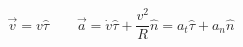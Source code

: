 \begin{equation}
\boxed{\vec v = v\hat\tau}\quad\quad \boxed{\vec a = \dot v \hat\tau + \frac{v^2}{R}\hat n = a_t\hat\tau + a_n\hat n}
\end{equation}
                                                                                                                                                                                                                                                                                                                                                                                                                                                                                                                                                                                                                                                                                                                                                                                                                                                                                                                                                                                                                                                                                                                                                                                                                                                                                                                                                                                                                                                                                                                                                                                                                                                                                                                                                                                                                                                                                                                                                                                                                                                                                                                                                                                                                                                                                                                                                                                                                                                                                                                                                                                                                                                                                                                                                                                                                                                                                                                                                                                                                                                                                                                                                                                  
